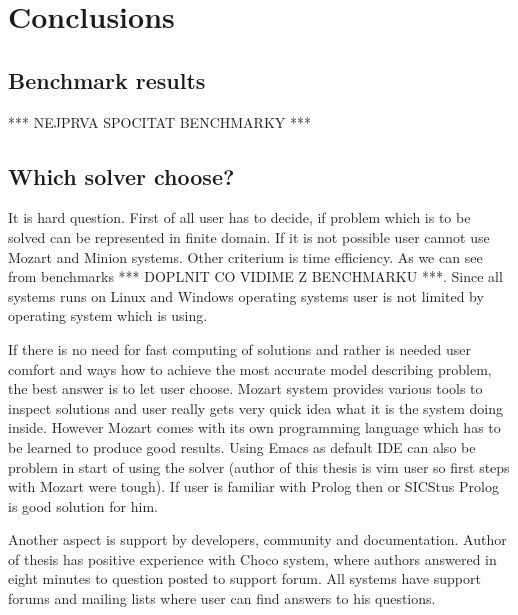 \chapter{Conclusions}
\thispagestyle{myheadings}

\section{Benchmark results}

*** NEJPRVA SPOCITAT BENCHMARKY ***

\section{Which solver choose?}

It is hard question. First of all user has to decide, if problem which is to be 
solved can be represented in finite domain. If it is not possible user cannot use
Mozart and Minion systems. Other criterium is time efficiency. As we can see from
benchmarks *** DOPLNIT CO VIDIME Z BENCHMARKU ***. Since all systems runs on Linux 
and Windows operating systems user is not limited by operating system which is using.

If there is no need for fast computing of solutions and rather is needed user comfort
and ways how to achieve the most accurate model describing problem, the best answer
is to let user choose. Mozart system provides various tools to inspect solutions 
and user really gets very quick idea what it is the system doing inside. However Mozart comes
with its own programming language which has to be learned to produce good results.
Using Emacs as default IDE can also be problem in start of using the solver (author
of this thesis is vim user so first steps with Mozart were tough). If user is familiar
with Prolog then \eclipse or SICStus Prolog is good solution for him. 



Another aspect is support by developers, community and documentation. Author of 
thesis has positive experience with Choco system, where authors answered in eight 
minutes to question posted to support forum. All systems have support forums and 
mailing lists where user can find answers to his questions.      
